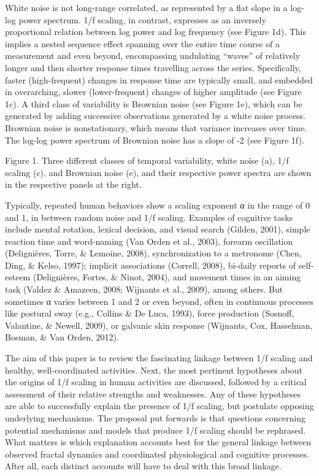 \documentclass[12pt,]{book}
\begin{document}
White noise is not long-range correlated, as represented by a flat slope in a log-log power spectrum. 1/f scaling, in contrast, expresses as an inversely proportional relation between log power and log frequency (see Figure 1d). This implies a nested sequence effect spanning over the entire time course of a measurement and even beyond, encompassing undulating ``waves'' of relatively longer and then shorter response times travelling across the series. Specifically, faster (high-frequent) changes in response time are typically small, and embedded in overarching, slower (lower-frequent) changes of higher amplitude (see Figure 1c). A third class of variability is Brownian noise (see Figure 1e), which can be generated by adding successive observations generated by a white noise process. Brownian noise is nonstationary, which means that variance increases over time. The log-log power spectrum of Brownian noise has a slope of -2 (see Figure 1f).

Figure 1. Three different classes of temporal variability, white noise (a), 1/f scaling (c), and Brownian noise (e), and their respective power spectra are shown in the respective panels at the right.

Typically, repeated human behaviors show a scaling exponent α in the range of 0 and 1, in between random noise and 1/f scaling. Examples of cognitive tasks include mental rotation, lexical decision, and visual search (Gilden, 2001), simple reaction time and word-naming (Van Orden et al., 2003), forearm oscillation (Delignières, Torre, \& Lemoine, 2008), synchronization to a metronome (Chen, Ding, \& Kelso, 1997); implicit associations (Correll, 2008), bi-daily reports of self-esteem (Delignières, Fortes, \& Ninot, 2004), and movement times in an aiming task (Valdez \& Amazeen, 2008; Wijnants et al., 2009), among others. But sometimes α varies between 1 and 2 or even beyond, often in continuous processes like postural sway (e.g., Collins \& De Luca, 1993), force production (Sosnoff, Valantine, \& Newell, 2009), or galvanic skin response (Wijnants, Cox, Hasselman, Bosman, \& Van Orden, 2012).

The aim of this paper is to review the fascinating linkage between 1/f scaling and healthy, well-coordinated activities. Next, the most pertinent hypotheses about the origins of 1/f scaling in human activities are discussed, followed by a critical assessment of their relative strengths and weaknesses. Any of these hypotheses are able to successfully explain the presence of 1/f scaling, but postulate opposing underlying mechanisms. The proposal put forwards is that questions concerning potential mechanisms and models that produce 1/f scaling should be rephrased. What matters is which explanation accounts best for the general linkage between observed fractal dynamics and coordinated physiological and cognitive processes. After all, each distinct accounts will have to deal with this broad linkage.
\end{document}
